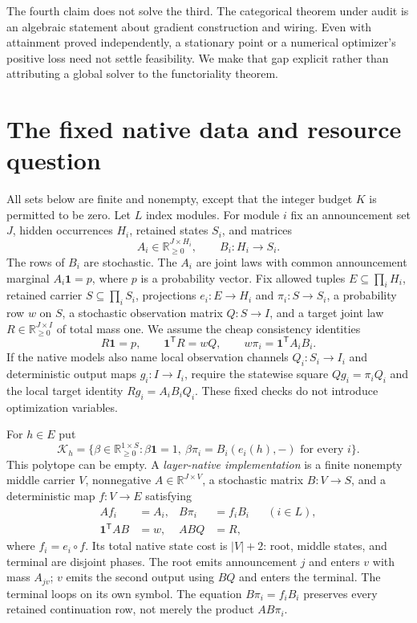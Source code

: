 \documentclass[11pt]{article}
\newcommand{\R}{\mathbb R}
\newcommand{\one}{\mathbf 1}
\newcommand{\Kcal}{\mathcal K}
\theoremstyle{remark}
\begin{document}
The fourth claim does not solve the third. The categorical theorem under audit is an algebraic statement about gradient construction and wiring. Even with attainment proved independently, a stationary point or a numerical optimizer's positive loss need not settle feasibility. We make that gap explicit rather than attributing a global solver to the functoriality theorem.

\section{The fixed native data and resource question}\label{sec:native}

All sets below are finite and nonempty, except that the integer budget $K$ is permitted to be zero. Let $L$ index modules. For module $i$ fix an announcement set $J$, hidden occurrences $H_i$, retained states $S_i$, and matrices
\[
 A_i\in\R_{\ge0}^{J\times H_i},\qquad
 B_i:H_i\longrightarrow S_i.
\]
The rows of $B_i$ are stochastic. The $A_i$ are joint laws with common announcement marginal $A_i\one=p$, where $p$ is a probability vector. Fix allowed tuples $E\subseteq\prod_i H_i$, retained carrier $S\subseteq\prod_i S_i$, projections $e_i:E\to H_i$ and $\pi_i:S\to S_i$, a probability row $w$ on $S$, a stochastic observation matrix $Q:S\to I$, and a target joint law $R\in\R_{\ge0}^{J\times I}$ of total mass one. We assume the cheap consistency identities
\[
 R\one=p,\qquad \one^{\mathsf T}R=wQ,\qquad
 w\pi_i=\one^{\mathsf T}A_iB_i.
\]
If the native models also name local observation channels $Q_i:S_i\to I_i$ and deterministic output maps $g_i:I\to I_i$, require the statewise square $Qg_i=\pi_iQ_i$ and the local target identity $Rg_i=A_iB_iQ_i$. These fixed checks do not introduce optimization variables.

For $h\in E$ put
\begin{equation}\label{eq:coupling-polytope}
 \Kcal_h=\{\beta\in\R_{\ge0}^{1\times S}:\beta\one=1,
 \ \beta\pi_i=B_i(e_i(h),-)\text{ for every }i\}.
\end{equation}
This polytope can be empty. A \emph{layer-native implementation} is a finite nonempty middle carrier $V$, nonnegative $A\in\R^{J\times V}$, a stochastic matrix $B:V\to S$, and a deterministic map $f:V\to E$ satisfying
\begin{align}
 Af_i&=A_i, &B\pi_i&=f_iB_i &&(i\in L),\label{eq:native-local}\\
 \one^{\mathsf T}AB&=w, &ABQ&=R,\label{eq:native-global}
\end{align}
where $f_i=e_i\circ f$. Its total native state cost is $|V|+2$: root, middle states, and terminal are disjoint phases. The root emits announcement $j$ and enters $v$ with mass $A_{jv}$; $v$ emits the second output using $BQ$ and enters the terminal. The terminal loops on its own symbol. The equation $B\pi_i=f_iB_i$ preserves every retained continuation row, not merely the product $AB\pi_i$.
\end{document}
